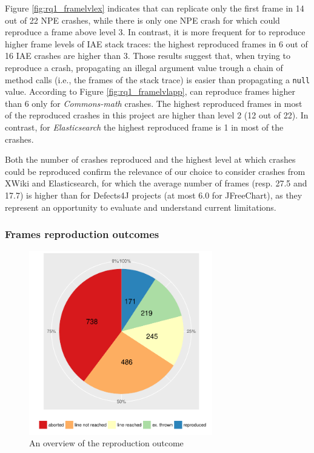 Figure \ref{fig:rq1_framelvlex} indicates that \evocrash can replicate only the first frame in 14 out of 22 NPE crashes, while there is only one NPE crash for which \evocrash could reproduce a frame above level 3. 
In contrast, it is more frequent for \evocrash to reproduce higher frame levels of IAE stack traces: the highest reproduced frames in 6 out of 16 IAE crashes are higher than 3.
%
Those results suggest that, when trying to reproduce a crash, propagating an illegal argument value trough a chain of method calls (i.e., the frames of the stack trace) is easier than propagating a \texttt{null} value. 
%
According to Figure \ref{fig:rq1_framelvlapp}, \evocrash can reproduce frames higher than 6 only for \textit{Commons-math} crashes. The highest reproduced frames in most of the reproduced crashes in this project are higher than level 2 (12 out of 22). 
In contrast, for \textit{Elasticsearch} the highest reproduced frame is 1 in most of the crashes.

Both the number of crashes reproduced and the highest level at which crashes could be reproduced confirm the relevance of our choice to consider crashes from XWiki and Elasticsearch, for which the average number of frames (resp. 27.5 and 17.7) is higher than for Defects4J projects (at most 6.0 for JFreeChart), as they represent an opportunity to evaluate and understand current limitations. 

\subsubsection{Frames reproduction outcomes} 

\begin{figure}[t]
	\centering
	\includegraphics[width=8cm]{papers/jcrashpack/rq1_summary.pdf}
	\caption{An overview of the reproduction outcome}
	\label{fig:rq1summary}
\end{figure}

